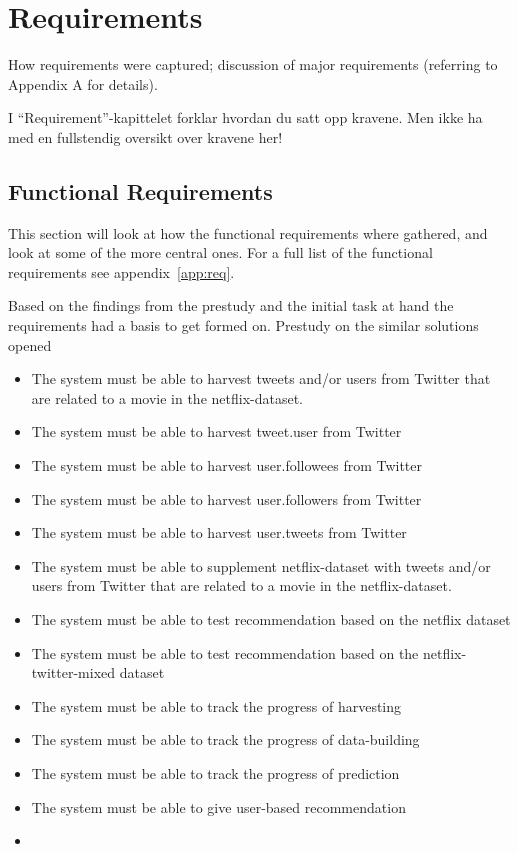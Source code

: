 
\chapter{Requirements}

\minitoc

How requirements  were  captured;
  discussion  of  major requirements
(referring  to  Appendix  A for details).

I “Requirement”-kapittelet forklar hvordan du satt opp kravene.
Men ikke ha med en fullstendig oversikt over kravene her!


\clearpage

\section{Functional Requirements}
This section will look at how the functional requirements where gathered, and look at some of the more central ones. For a full list of the functional requirements see appendix~\ref{app:req}.

Based on the findings from the prestudy and the initial task at hand the requirements had a basis to get formed on. Prestudy on the similar solutions opened

\begin{itemize}
  \item The system must be able to harvest tweets and/or users from Twitter that are related to a movie in the netflix-dataset.
  \item The system must be able to harvest tweet.user from Twitter
  \item The system must be able to harvest user.followees from Twitter
  \item The system must be able to harvest user.followers from Twitter
  \item The system must be able to harvest user.tweets from Twitter

  \item The system must be able to supplement netflix-dataset with tweets and/or users from Twitter that are related to a movie in the netflix-dataset.
  \item The system must be able to test recommendation based on the netflix dataset
  \item The system must be able to test recommendation based on the netflix-twitter-mixed dataset
  \item The system must be able to track the progress of harvesting
  \item The system must be able to track the progress of data-building
  \item The system must be able to track the progress of prediction
  \item The system must be able to give user-based recommendation
  \item
\end{itemize}

